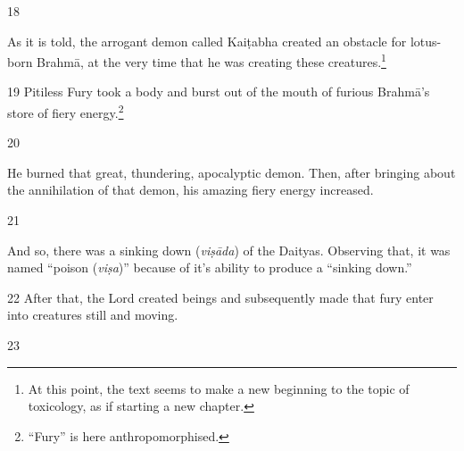 \begin{translation}
\item [18]

As it is told, the arrogant demon called Kaiṭabha created an obstacle for
lotus-born Brahmā, at the very time that he was creating these creatures.\footnote{At 
this point, the text seems to make a new beginning to the topic of toxicology, as if 
starting a new chapter.}

\item[19]
Pitiless Fury took a body and burst out of the mouth of furious Brahmā's store of fiery 
energy.\footnote{“Fury” is here anthropomorphised.}

\item[20]

He burned that great, thundering, apocalyptic demon.   Then, after bringing about
the annihilation of that demon,  his amazing fiery energy increased.

\item [21]

And so, there was a sinking down (\emph{viṣāda}) of the Daityas.   Observing that, it 
was named “poison (\emph{viṣa})” because of it's ability to produce a “sinking down.” 

\item [22] After that, the Lord created beings and subsequently made that fury
enter into creatures still and moving.

\item [23]



\end{translation}